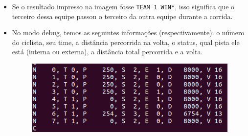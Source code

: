 \documentclass{beamer}
\begin{document}
\begin{frame}
	\begin{itemize}
		\item Se o resultado impresso na imagem fosse \texttt{TEAM 1 WIN*}, isso significa que o terceiro dessa equipe passou o terceiro da outra equipe durante a corrida.
		\item No modo debug, temos as seguintes informações (respectivamente): o número do ciclista, seu time, a distância percorrida na volta, o status, qual pista ele está (interna ou externa), a distância total percorrida e a volta.
		\begin{figure}[!h]
			\centering
			\includegraphics[scale=0.5]{6.png}
		\end{figure}
	\end{itemize}
\end{frame}
\end{document}
